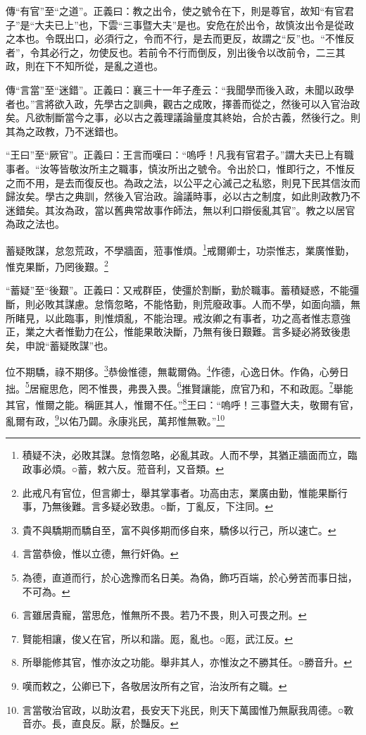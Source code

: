 {\noindent\zhuan{}\fzbyks 傳“有官”至“之道”。正義曰：教之出令，使之號令在下，則是尊官，故知“有官君子”是“大夫已上”也，下雲“三事暨大夫”是也。安危在於出令，故慎汝出令是從政之本也。令既出口，必須行之，令而不行，是去而更反，故謂之“反”也。“不惟反者”，令其必行之，勿使反也。若前令不行而倒反，別出後令以改前令，二三其政，則在下不知所從，是亂之道也。 \par}

{\noindent\zhuan{}\fzbyks 傳“言當”至“迷錯”。正義曰：襄三十一年子產云：“我聞學而後入政，未聞以政學者也。”言將欲入政，先學古之訓典，觀古之成敗，擇善而從之，然後可以入官治政矣。凡欲制斷當今之事，必以古之義理議論量度其終始，合於古義，然後行之。則其為之政教，乃不迷錯也。 \par}

{\noindent\shu{}\fzkt “王曰”至“厥官”。正義曰：王言而嘆曰：“嗚呼！凡我有官君子。”謂大夫已上有職事者。“汝等皆敬汝所主之職事，慎汝所出之號令。令出於口，惟即行之，不惟反之而不用，是去而復反也。為政之法，以公平之心滅己之私慾，則見下民其信汝而歸汝矣。學古之典訓，然後入官治政。論議時事，必以古之制度，如此則政教乃不迷錯矣。其汝為政，當以舊典常故事作師法，無以利口辯佞亂其官”。教之以居官為政之法也。 \par}

蓄疑敗謀，怠忽荒政，不學牆面，蒞事惟煩。\footnote{積疑不決，必敗其謀。怠惰忽略，必亂其政。人而不學，其猶正牆面而立，臨政事必煩。○蓄，敕六反。蒞音利，又音類。}戒爾卿士，功崇惟志，業廣惟勤，惟克果斷，乃罔後艱。\footnote{此戒凡有官位，但言卿士，舉其掌事者。功高由志，業廣由勤，惟能果斷行事，乃無後難。言多疑必致患。○斷，丁亂反，下注同。}

{\noindent\shu{}\fzkt “蓄疑”至“後艱”。正義曰：又戒群臣，使彊於割斷，勤於職事。蓄積疑惑，不能彊斷，則必敗其謀慮。怠惰忽略，不能恪勤，則荒廢政事。人而不學，如面向牆，無所睹見，以此臨事，則惟煩亂，不能治理。戒汝卿之有事者，功之高者惟志意強正，業之大者惟勤力在公，惟能果敢決斷，乃無有後日艱難。言多疑必將致後患矣，申說“蓄疑敗謀”也。 \par}

位不期驕，祿不期侈。\footnote{貴不與驕期而驕自至，富不與侈期而侈自來，驕侈以行己，所以速亡。}恭儉惟德，無載爾偽。\footnote{言當恭儉，惟以立德，無行奸偽。}作德，心逸日休。作偽，心勞日拙。\footnote{為德，直道而行，於心逸豫而名日美。為偽，飾巧百端，於心勞苦而事日拙，不可為。}居寵思危，罔不惟畏，弗畏入畏。\footnote{言雖居貴寵，當思危，惟無所不畏。若乃不畏，則入可畏之刑。}推賢讓能，庶官乃和，不和政厖。\footnote{賢能相讓，俊乂在官，所以和諧。厖，亂也。○厖，武江反。}舉能其官，惟爾之能。稱匪其人，惟爾不任。”\footnote{所舉能修其官，惟亦汝之功能。舉非其人，亦惟汝之不勝其任。○勝音升。}王曰：“嗚呼！三事暨大夫，敬爾有官，亂爾有政，\footnote{嘆而敕之，公卿已下，各敬居汝所有之官，治汝所有之職。}以佑乃闢。永康兆民，萬邦惟無斁。”\footnote{言當敬治官政，以助汝君，長安天下兆民，則天下萬國惟乃無厭我周德。○斁音亦。長，直良反。厭，於豔反。}

